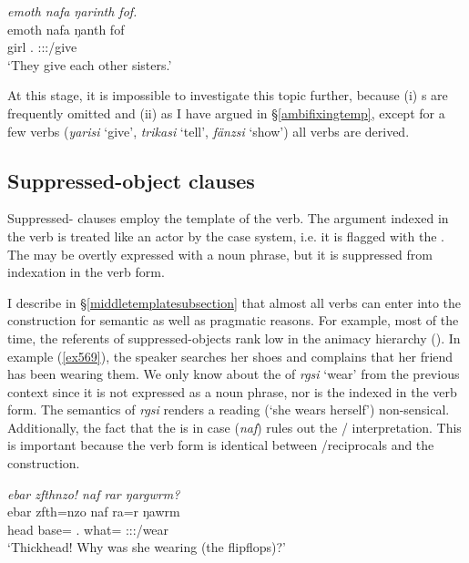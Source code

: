 \begin{exe}
 	\ex \emph{emoth nafa ŋarinth fof.}\\
 	\gll emoth nafa ŋanth fof\\
 	girl \Tnsg.{\Erg} \Stdu:\Sbj:\Nonpast:\Ipfv/give {\Emph}\\
 	\trans `They give each other sisters.'
 	\label{ex568}
\end{exe}

At this stage, it is impossible to investigate this topic further, because (i) s are frequently omitted and (ii) as I have argued in {\S}\ref{ambifixingtemp}, except for a few verbs (\emph{yarisi} `give', \emph{trikasi} `tell', \emph{fänzsi} `show') all  verbs are derived.

\subsection{Suppressed-object clauses}\label{suppressedobjectclause}

Suppressed- clauses employ the  template of the verb. The argument indexed in the verb is treated like an actor by the case system, i.e. it is flagged with the  . The  may be overtly expressed with a noun phrase, but it is suppressed from indexation in the verb form.

I describe in {\S}\ref{middletemplatesubsection} that almost all  verbs can enter into the  construction for semantic as well as pragmatic reasons. For example, most of the time, the referents of suppressed-objects rank low in the animacy hierarchy (\citealt{Silverstein:1976vo}). In example (\ref{ex569}), the speaker searches her shoes and complains that her friend has been wearing them. We only know about the  of \emph{rgsi} `wear' from the previous context since it is not expressed as a noun phrase, nor is the  indexed in the verb form. The semantics of \emph{rgsi} renders a  reading (`she wears herself') non-sensical. Additionally, the fact that the  is in  case (\emph{naf}) rules out the / interpretation. This is important because the verb form is identical between /reciprocals and the  construction.

\begin{exe}
	\ex \emph{ebar zfthnzo! naf rar ŋargwrm?}\\
	\gll ebar zfth=nzo naf ra=r ŋawrm\\
	head base={\Only} \Tsg.{\Erg} what={\Purp} \Sg:\Sbj:\Rpst:\Dur/wear\\
	\trans `Thickhead! Why was she wearing (the flipflops)?'
	\label{ex569}
\end{exe}

